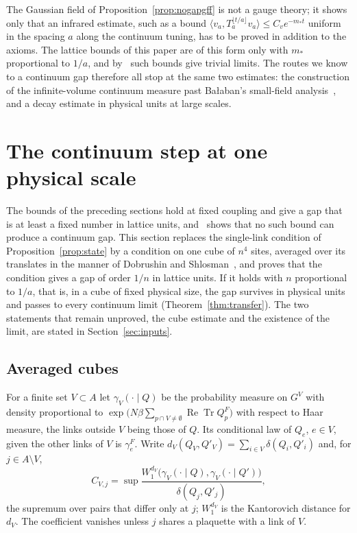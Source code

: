 \documentclass[11pt]{amsart}
\theoremstyle{definition}
\theoremstyle{remark}
\numberwithin{equation}{section}
\newcommand{\ReTr}{\operatorname{Re}\operatorname{Tr}}
\newcommand{\ip}[2]{\langle #1,#2\rangle}
\begin{document}
The Gaussian field of Proposition~\ref{prop:nogapgff} is not a gauge theory;
it shows only that an infrared estimate, such as a bound
$\ip{v_a}{T_a^{\lfloor t/a\rfloor}v_a}\le C_ve^{-m_*t}$ uniform in the spacing $a$
along the continuum tuning, has to be proved in addition to the axioms. The
lattice bounds of this paper are of this form only with $m_*$ proportional
to $1/a$, and by~\cite{BB26b} such bounds give trivial limits. The routes we
know to a continuum gap therefore all stop at the same two estimates: the
construction of the infinite-volume continuum measure past
Ba{\l}aban's small-field analysis~\cite{Bal84a,Bal89b}, and a decay estimate in physical
units at large scales.

\section{The continuum step at one physical scale}\label{sec:bypass}

The bounds of the preceding sections hold at fixed coupling and give a gap
that is at least a fixed number in lattice units, and~\cite{BB26b} shows that
no such bound can produce a continuum gap. This section replaces the
single-link condition of Proposition~\ref{prop:state} by a condition on one
cube of $n^4$ sites, averaged over its translates in the manner of Dobrushin
and Shlosman~\cite{DS85}, and proves that the condition gives a gap of order
$1/n$ in lattice units. If it holds with $n$ proportional to $1/a$, that is,
in a cube of fixed physical size, the gap survives in physical units and
passes to every continuum limit (Theorem~\ref{thm:transfer}). The two
statements that remain unproved, the cube estimate and the existence of the
limit, are stated in Section~\ref{sec:inputs}.

\subsection{Averaged cubes}

For a finite set $V\subset A$ let $\gamma_V(\cdot\mid Q)$ be the probability
measure on $G^V$ with density proportional to $\exp\bigl(N\beta\sum_{p\cap
V\ne\emptyset}\ReTr Q^F_p\bigr)$ with respect to Haar measure, the links
outside $V$ being those of $Q$. Its conditional law of $Q_e$, $e\in V$, given
the other links of $V$ is $\gamma^F_e$. Write $d_V(Q_V,Q'_V)=\sum_{i\in V}
\delta(Q_i,Q'_i)$ and, for $j\in A\setminus V$,
\[
C_{V,j}=\sup\frac{W_1^{d_V}\bigl(\gamma_V(\cdot\mid Q),\gamma_V(\cdot\mid
Q')\bigr)}{\delta(Q_j,Q'_j)},
\]
the supremum over pairs that differ only at $j$; $W_1^{d_V}$ is the
Kantorovich distance for $d_V$. The coefficient vanishes unless $j$ shares a
plaquette with a link of $V$.
\end{document}
